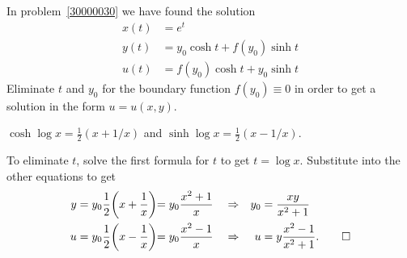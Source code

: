 In problem~\ref{30000030} we have found the solution
\begin{align*}
x(t) &= e^t           \\
y(t) &= y_0 \cosh t + f(y_0) \sinh t   \\
u(t) &= f(y_0) \cosh t + y_0 \sinh t
\end{align*}
Eliminate $t$ and $y_0$ for the boundary function $f(y_0)\equiv 0$ in order
to get a solution in the form $u = u(x,y)$.

\begin{hinweis}
$\cosh \log x = \frac12(x+1/x)$ and
$\sinh \log x = \frac12(x-1/x)$.
\end{hinweis}

\begin{loesung}
To eliminate $t$, solve the first formula for $t$ to get $t=\log x$.
Substitute into the other equations to get
\begin{align*}
y &= y_0 \frac12\biggl(x+\frac1x\biggl) = y_0\frac{x^2+1}{x}
&&\Rightarrow &
y_0 &= \frac{xy}{x^2+1}\\
u &= y_0 \frac12\biggl(x-\frac1x\biggl) = y_0\frac{x^2-1}{x}
&&\Rightarrow &
u &= y\frac{x^2-1}{x^2+1}.
\qedhere
\end{align*}
\end{loesung}




